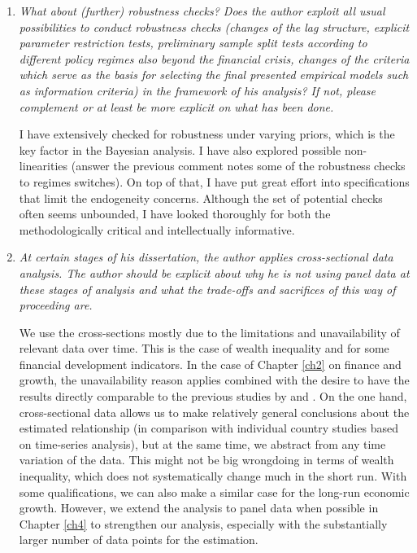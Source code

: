 \begin{enumerate}
    \item \textit{What about (further) robustness checks? Does the author exploit all usual possibilities to conduct robustness checks (changes of the lag structure, explicit parameter restriction tests, preliminary sample split tests according to different policy regimes also beyond the financial crisis, changes of the criteria which serve as the basis for selecting the final presented empirical models such as information criteria) in the framework of his analysis? If not, please complement or at least be more explicit on what has been done.}

    I have extensively checked for robustness under varying priors, which is the key factor in the Bayesian analysis. I have also explored possible non-linearities (answer the previous comment notes some of the robustness checks to regimes switches). On top of that, I have put great effort into specifications that limit the endogeneity concerns. Although the set of potential checks often seems unbounded, I have looked thoroughly for both the methodologically critical and intellectually informative.

    \item \textit{At certain stages of his dissertation, the author applies cross-sectional data analysis. The author should be explicit about why he is not using panel data at these stages of analysis and what the trade-offs and sacrifices of this way of proceeding are.}
    
    We use the cross-sections mostly due to the limitations and unavailability of relevant data over time. This is the case of wealth inequality and for some financial development indicators. In the case of Chapter \ref{ch2} on finance and growth, the unavailability reason applies combined with the desire to have the results directly comparable to the previous studies by \textcite{Fernandezetal2001} and \textcite{SalaiMartin1997}. On the one hand, cross-sectional data allows us to make relatively general conclusions about the estimated relationship (in comparison with individual country studies based on time-series analysis), but at the same time, we abstract from any time variation of the data. This might not be big wrongdoing in terms of wealth inequality, which does not systematically change much in the short run. With some qualifications, we can also make a similar case for the long-run economic growth. However, we extend the analysis to panel data when possible in Chapter \ref{ch4} to strengthen our analysis, especially with the substantially larger number of data points for the estimation.


\end{enumerate}
